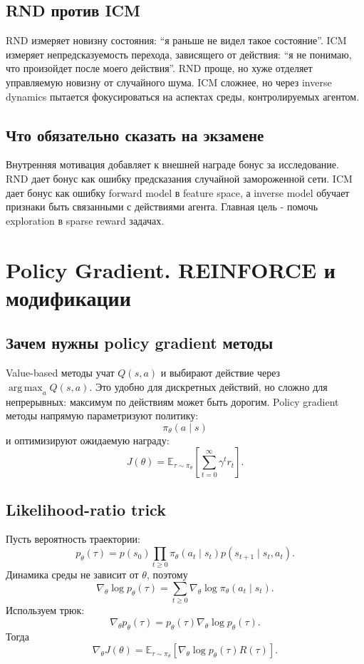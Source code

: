 \documentclass[11pt,a4paper]{article}
\newcommand{\E}{\mathbb{E}}
\newcommand{\argmax}{\operatorname*{arg\,max}}
\newcommand{\1}{\mathbf{1}}
\begin{document}
\subsection*{RND против ICM}
RND измеряет новизну состояния: ``я раньше не видел такое состояние''. ICM измеряет непредсказуемость перехода, зависящего от действия: ``я не понимаю, что произойдет после моего действия''. RND проще, но хуже отделяет управляемую новизну от случайного шума. ICM сложнее, но через inverse dynamics пытается фокусироваться на аспектах среды, контролируемых агентом.

\subsection*{Что обязательно сказать на экзамене}
Внутренняя мотивация добавляет к внешней награде бонус за исследование. RND дает бонус как ошибку предсказания случайной замороженной сети. ICM дает бонус как ошибку forward model в feature space, а inverse model обучает признаки быть связанными с действиями агента. Главная цель - помочь exploration в sparse reward задачах.

\newpage
\section{Policy Gradient. REINFORCE и модификации}

\subsection*{Зачем нужны policy gradient методы}
Value-based методы учат $Q(s,a)$ и выбирают действие через $\argmax_a Q(s,a)$. Это удобно для дискретных действий, но сложно для непрерывных: максимум по действиям может быть дорогим. Policy gradient методы напрямую параметризуют политику:
\[
    \pi_\theta(a\mid s)
\]
и оптимизируют ожидаемую награду:
\[
    J(\theta)=\E_{\tau\sim\pi_\theta}\left[\sum_{t=0}^\infty\gamma^t r_t\right].
\]

\subsection*{Likelihood-ratio trick}
Пусть вероятность траектории:
\[
    p_\theta(\tau)=p(s_0)\prod_{t\ge0}\pi_\theta(a_t\mid s_t)p(s_{t+1}\mid s_t,a_t).
\]
Динамика среды не зависит от $\theta$, поэтому
\[
    \nabla_\theta \log p_\theta(\tau)=\sum_{t\ge0}\nabla_\theta\log \pi_\theta(a_t\mid s_t).
\]
Используем трюк:
\[
    \nabla_\theta p_\theta(\tau)=p_\theta(\tau)\nabla_\theta\log p_\theta(\tau).
\]
Тогда
\[
    \nabla_\theta J(\theta)=\E_{\tau\sim\pi_\theta}\left[\nabla_\theta\log p_\theta(\tau)R(\tau)\right].
\]
\end{document}
